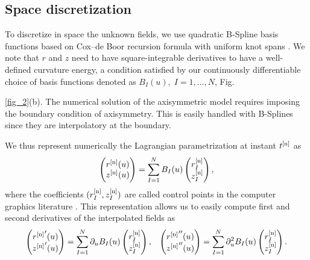 \subsection{Space discretization}

To discretize in space the unknown fields, we use quadratic B-Spline basis functions based on Cox–de Boor recursion formula with uniform knot spans \cite{piegl1996}. We note that $r$ and $z$ need to have square-integrable derivatives to have a well-defined curvature energy, a condition satisfied by our continuously differentiable choice of basis functions denoted as $B_I(u), \; I=1, \ldots, N$, Fig.~{\ref{fig_2}(b). The numerical solution of the axisymmetric model requires imposing the boundary condition of axisymmetry. This is easily handled with B-Splines since they are interpolatory at the boundary. 

We thus represent numerically the Lagrangian parametrization at instant $t^{[\textup{n}]}$ as 
\begin{equation} \label{16_III}
\begin{pmatrix}
	r^{[\textup{n}]}(u)\\ 
	z^{[\textup{n}]}(u)
\end{pmatrix}= \sum_{I=1}^{N}  B_{I}(u)\begin{pmatrix}
	r_I^{[\textup{n}]}\\ 
	z_I^{[\textup{n}]}
\end{pmatrix},
\end{equation}
where the coefficients $(r_I^{[\textup{n}]},z_I^{[\textup{n}]})$ are called control points in the computer graphics literature  \cite{piegl1996}. This representation allows us to easily compute first and second derivatives of the interpolated fields as 
\begin{equation} 
	\begin{pmatrix}
		{r^{[\textup{n}]}}'(u)\\ 
		{z^{[\textup{n}]}}'(u)
	\end{pmatrix}= \sum_{I=1}^{N} \partial_u B_{I}(u)\begin{pmatrix}
		r_I^{[\textup{n}]}\\ 
		z_I^{[\textup{n}]}
	\end{pmatrix}, \;\;\;
	\begin{pmatrix}
		{r^{[\textup{n}]}}''(u)\\ 
		{z^{[\textup{n}]}}''(u)
	\end{pmatrix}= \sum_{I=1}^{N} \partial^2_u B_{I}(u)\begin{pmatrix}
		r_I^{[\textup{n}]}\\ 
		z_I^{[\textup{n}]}
	\end{pmatrix}.
\end{equation}


}
